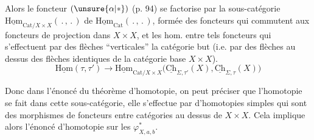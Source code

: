 
Alors le foncteur $(\unsure{\alpha|*})$ (p. 94)  se factorise par la sous-catégorie $\underline{\mathrm{Hom}}_{\mathrm{Cat}/X\times X}(\,.\,,\,.\,)$ de $\underline{\mathrm{Hom}}_{\mathrm{Cat}}(\,.\,,\,.\,)$, formée des foncteurs qui commutent aux foncteurs de projection dans $X\times X$, et les hom. entre tels foncteurs qui s'effectuent par des flèches ``verticales''  la catégorie but (i.e. par des flèches au dessus des flèches identiques de la catégorie base $X\times X$).
\[
\underline{\mathrm{Hom}}(\tau,\tau')\longrightarrow\underline{\mathrm{Hom}}_{\mathrm{Cat}/X\times X}
\bigl(\underline{\mathrm{Ch}}_{\Sigma,\tau'}(X),\underline{\mathrm{Ch}}_{\Sigma,\tau}(X)\bigr)
\]
\unsure{:}

Donc dans l'énoncé du théorème d'homotopie, on peut préciser que l'homotopie se fait dans cette sous-catégorie, elle s'effectue par   d'homotopies simples qui sont des morphismes de foncteurs entre catégories au dessus de $X\times X$. Cela implique alors l'énoncé d'homotopie sur les $\varphi_{X,a,b}^*$.

